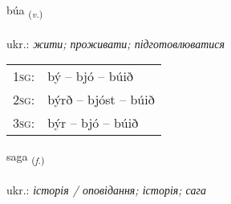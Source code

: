 \documentclass[frontgrid, backgrid]{flacards}\usepackage[]{graphicx}\usepackage[]{xcolor}
\begin{document}
\renewcommand{\flhead}{\vskip5pt \fboxsep=0pt {\small\bfseries\footnotesize Sagnorð | дієслово}}
\renewcommand{\fcfoot}{\vskip5pt \fboxsep=0pt \hspace{2pt}{\small\bfseries\footnotesize 1K}}

\renewcommand{\blhead}{\vskip5pt {\small\bfseries\footnotesize Sagnorð | дієслово }}
\renewcommand{\bcfoot}{\vskip5pt \hspace{2pt}{\small\bfseries\footnotesize 1K}}


{búa \small{\textsubscript{(\textit{v.})}} \\[1ex] %
\textphonetic{[puːa]} \\
ukr.: \emph{жити; проживати; підготовлюватися} \\  [2ex]
\renewcommand*{\arraystretch}{0.8}
\begin{tabular}{p{1cm}l}
\textsc{1sg}: & bý -- bjó -- búið \\ 
\textsc{2sg}: & býrð -- bjóst -- búið \\ 
\textsc{3sg}: & býr -- bjó -- búið \\ 
\end{tabular}
}

\renewcommand{\flhead}{\vskip5pt \fboxsep=0pt {\small\bfseries\footnotesize Nafnorð | іменник}}
\renewcommand{\fcfoot}{\vskip5pt \fboxsep=0pt \hspace{2pt}{\small\bfseries\footnotesize 1K}}

\renewcommand{\blhead}{\vskip5pt {\small\bfseries\footnotesize Nafnorð | іменник }}
\renewcommand{\bcfoot}{\vskip5pt \hspace{2pt}{\small\bfseries\footnotesize 1K}}


{saga \small{\textsubscript{(\textit{f.})}} \\[1ex] %
\textphonetic{[saːɣa]} \\
ukr.: \emph{історія / оповідання; історія; сага} \\  [2ex]
\renewcommand*{\arraystretch}{0.8}
}
\end{document}
